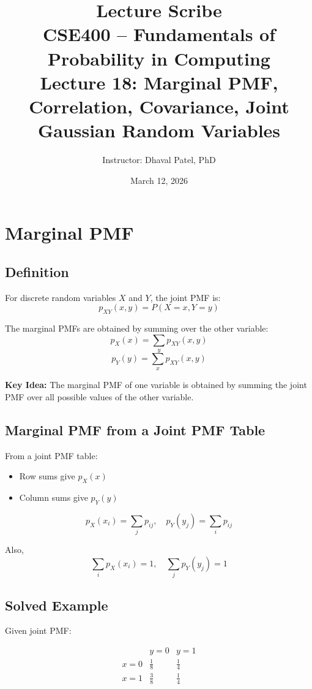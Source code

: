 \documentclass[12pt]{article}
\begin{document}
\title{Lecture Scribe\\
CSE400 – Fundamentals of Probability in Computing\\
Lecture 18: Marginal PMF, Correlation, Covariance, Joint Gaussian Random Variables}
\author{Instructor: Dhaval Patel, PhD}
\date{March 12, 2026}
\maketitle

\section{Marginal PMF}

\subsection{Definition}

For discrete random variables $X$ and $Y$, the joint PMF is:
\[
p_{XY}(x,y) = P(X = x, Y = y)
\]

The marginal PMFs are obtained by summing over the other variable:
\[
p_X(x) = \sum_{y} p_{XY}(x,y)
\]
\[
p_Y(y) = \sum_{x} p_{XY}(x,y)
\]

\textbf{Key Idea:} The marginal PMF of one variable is obtained by summing the joint PMF over all possible values of the other variable.

\subsection{Marginal PMF from a Joint PMF Table}

From a joint PMF table:
\begin{itemize}
\item Row sums give $p_X(x)$
\item Column sums give $p_Y(y)$
\end{itemize}

\[
p_X(x_i) = \sum_j p_{ij}, \quad p_Y(y_j) = \sum_i p_{ij}
\]

Also,
\[
\sum_i p_X(x_i) = 1, \quad \sum_j p_Y(y_j) = 1
\]

\subsection{Solved Example}

Given joint PMF:

\[
\begin{array}{c|cc}
 & y=0 & y=1 \\
\hline
x=0 & \frac{1}{8} & \frac{1}{4} \\
x=1 & \frac{3}{8} & \frac{1}{4}
\end{array}
\]
\end{document}
